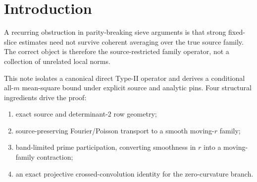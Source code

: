 \documentclass[11pt]{article}
\theoremstyle{definition}
\newcommand{\1}{\mathbf 1}
\begin{document}
\begin{abstract}
Part~III records a refined Ford--Maynard landing strip.  Ford--Maynard
Theorem~8.3 gives a published five-collar description of the exceptional
$H_2$ geometry, and Definition~5.1 identifies the coordinates of $\mathbf v(n)$
with logarithms of the individual prime factors.  This permits a more
source-specific treatment of the rough $N_2$ sector: squareful terms are
negligible, while the squarefree shifted-prime lane reduces, at the research
level, to a standard uniform upper sieve for two linear forms plus the published
rough-number geometry.  A proof audit of Proposition~7.22 shows that the
published universal Type-II hypothesis is invoked only after the proof has
generated the grouped equation~(7.23), so controlling every \emph{actual
generated} instance of that structured sum is a proof-specific sufficient
landing point.  Internal Ford-side archaeology further indicates finite-depth
generated one-variable factors and finite nuclear/weight-dependence compilers;
however, the literal source-exact weighted high-complexity packet dictionary
from Gate outputs to the Ford-generated factors remains missing.  We call this
source interface \texttt{SOURCE-ADAPTER45}.  These are programme reductions,
not weaker theorems published by Ford--Maynard.

No claim of Gate-1B closure, Full Type-II reassembly, a Hardy--Littlewood
prime-pair asymptotic, or twin-prime infinitude is made.
\end{abstract}

\tableofcontents
\section{Introduction}
A recurring obstruction in parity-breaking sieve arguments is that strong
fixed-slice estimates need not survive coherent averaging over the true source
family. The correct object is therefore the source-restricted family operator,
not a collection of unrelated local norms.

This note isolates a canonical direct Type-II operator and derives a conditional
all-$m$ mean-square bound under explicit source and analytic pins. Four structural ingredients drive the proof:
\begin{enumerate}[label=(\roman*)]
  \item exact source and determinant-$2$ row geometry;
  \item source-preserving Fourier/Poisson transport to a smooth moving-$r$
        family;
  \item band-limited prime participation, converting smoothness in $r$ into a
        moving-family contraction;
  \item an exact projective crossed-convolution identity for the zero-curvature
        branch.
\end{enumerate}
\end{document}
